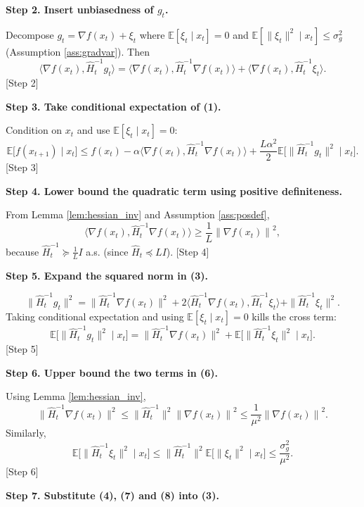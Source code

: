 \documentclass{article}
\newcommand{\E}{\mathbb{E}}
\newcommand{\norm}[1]{\left\lVert#1\right\rVert}
\newcommand{\grad}{\nabla}
\begin{document}
\noindent\textbf{Step 2. Insert unbiasedness of $g_t$.}  

Decompose $g_t=\grad f(x_t)+\xi_t$ where $\E[\xi_t\mid x_t]=0$ and $\E\!\left[\|\xi_t\|^{2}\mid x_t\right]\le\sigma_g^{2}$ (Assumption \ref{ass:gradvar}). Then
\[
\big\langle\grad f(x_t),\widehat H_t^{-1}g_t\big\rangle
=\big\langle\grad f(x_t),\widehat H_t^{-1}\grad f(x_t)\big\rangle
+\big\langle\grad f(x_t),\widehat H_t^{-1}\xi_t\big\rangle .
\tag{2}
\]
[Step 2]

\noindent\textbf{Step 3. Take conditional expectation of (1).}  

Condition on $x_t$ and use $\E[\xi_t\mid x_t]=0$:
\[
\E\!\bigl[f(x_{t+1})\mid x_t\bigr]\le
f(x_t)-\alpha\big\langle\grad f(x_t),\widehat H_t^{-1}\grad f(x_t)\big\rangle
+\frac{L\alpha^{2}}{2}\E\!\bigl[\|\widehat H_t^{-1}g_t\|^{2}\mid x_t\bigr].
\tag{3}
\]
[Step 3]

\noindent\textbf{Step 4. Lower bound the quadratic term using positive definiteness.}  

From Lemma \ref{lem:hessian_inv} and Assumption \ref{ass:posdef},
\[
\big\langle\grad f(x_t),\widehat H_t^{-1}\grad f(x_t)\big\rangle
\ge \frac{1}{L}\norm{\grad f(x_t)}^{2},
\tag{4}
\]
because $\widehat H_t^{-1}\succeq \frac{1}{L}I$ a.s. (since $\widehat H_t\preceq L I$).  
[Step 4]

\noindent\textbf{Step 5. Expand the squared norm in (3).}  

\[
\|\widehat H_t^{-1}g_t\|^{2}
=\|\widehat H_t^{-1}\grad f(x_t)\|^{2}
+2\langle\widehat H_t^{-1}\grad f(x_t),\widehat H_t^{-1}\xi_t\rangle
+\|\widehat H_t^{-1}\xi_t\|^{2}.
\tag{5}
\]
Taking conditional expectation and using $\E[\xi_t\mid x_t]=0$ kills the cross term:
\[
\E\!\bigl[\|\widehat H_t^{-1}g_t\|^{2}\mid x_t\bigr]
=\|\widehat H_t^{-1}\grad f(x_t)\|^{2}
+\E\!\bigl[\|\widehat H_t^{-1}\xi_t\|^{2}\mid x_t\bigr].
\tag{6}
\]
[Step 5]

\noindent\textbf{Step 6. Upper bound the two terms in (6).}  

Using Lemma \ref{lem:hessian_inv},
\[
\|\widehat H_t^{-1}\grad f(x_t)\|^{2}
\le \bigl\|\widehat H_t^{-1}\bigr\|^{2}\norm{\grad f(x_t)}^{2}
\le \frac{1}{\mu^{2}}\norm{\grad f(x_t)}^{2}.
\tag{7}
\]
Similarly,
\[
\E\!\bigl[\|\widehat H_t^{-1}\xi_t\|^{2}\mid x_t\bigr]
\le \bigl\|\widehat H_t^{-1}\bigr\|^{2}\E\!\bigl[\|\xi_t\|^{2}\mid x_t\bigr]
\le \frac{\sigma_g^{2}}{\mu^{2}}.
\tag{8}
\]
[Step 6]

\noindent\textbf{Step 7. Substitute (4), (7) and (8) into (3).}  
\end{document}
